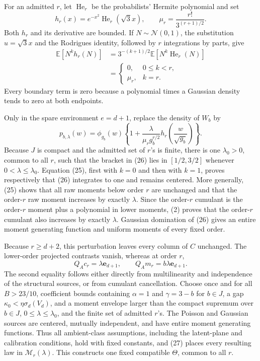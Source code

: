 For an admitted \(r\), let \(\operatorname{He}_r\) be the probabilists' Hermite polynomial and set
\[
 h_r(x)=e^{-x^2}\operatorname{He}_r(\sqrt3x),
 \qquad \mu_r=\frac{r!}{3^{(r+1)/2}}. \tag{24}
\]
Both \(h_r\) and its derivative are bounded.  If \(N\sim\mathcal N(0,1)\), the substitution \(u=\sqrt3x\) and the Rodrigues identity, followed by \(r\) integrations by parts, give
\[
 \begin{aligned}
 \mathbb E[N^kh_r(N)]
 &=3^{-(k+1)/2}\mathbb E[N^k\operatorname{He}_r(N)]\\
 &=\begin{cases}
 0,&0\leq k<r,\\
 \mu_r,&k=r.
 \end{cases}
 \end{aligned} \tag{25}
\]
Every boundary term is zero because a polynomial times a Gaussian density tends to zero at both endpoints.

Only in the spare environment \(e=d+1\), replace the density of \(W_b\) by
\[
 p_{b,\lambda}(w)=\phi_{g_b}(w)
 \left\{1+\frac{\lambda}{\mu_rg_b^{r/2}}
 h_r\!\left(\frac{w}{\sqrt{g_b}}\right)\right\}. \tag{26}
\]
Because \(J\) is compact and the admitted set of \(r\)'s is finite, there is one \(\lambda_0>0\), common to all \(r\), such that the bracket in (26) lies in \([1/2,3/2]\) whenever \(0<\lambda\leq\lambda_0\).  Equation (25), first with \(k=0\) and then with \(k=1\), proves respectively that (26) integrates to one and remains centered.  More generally, (25) shows that all raw moments below order \(r\) are unchanged and that the order-\(r\) raw moment increases by exactly \(\lambda\).  Since the order-\(r\) cumulant is the order-\(r\) moment plus a polynomial in lower moments, (2) proves that the order-\(r\) cumulant also increases by exactly \(\lambda\).  Gaussian domination of (26) gives an entire moment generating function and uniform moments of every fixed order.

Because \(r\geq d+2\), this perturbation leaves every column of \(C\) unchanged.  The lower-order projected contrasts vanish, whereas at order \(r\),
\[
 Q_Ac_r=\lambda\mathbf e_{d+1},\qquad
 Q_Am_r=b\lambda\mathbf e_{d+1}. \tag{27}
\]
The second equality follows either directly from multilinearity and independence of the structural sources, or from cumulant cancellation.  Choose once and for all \(B>23/10\), coefficient bounds containing \(\alpha=1\) and \(\gamma=3-b\) for \(b\in J\), a gap \(\kappa_0<\eta\sigma_d(V_d)\), and a moment envelope larger than the compact supremum over \(b\in J\), \(0\leq\lambda\leq\lambda_0\), and the finite set of admitted \(r\)'s.  The Poisson and Gaussian sources are centered, mutually independent, and have entire moment generating functions.  Thus all ambient-class assumptions, including the latent-plane and calibration conditions, hold with fixed constants, and (27) places every resulting law in \(\mathcal M_r(\lambda)\).  This constructs one fixed compatible \(\Theta\), common to all \(r\).


